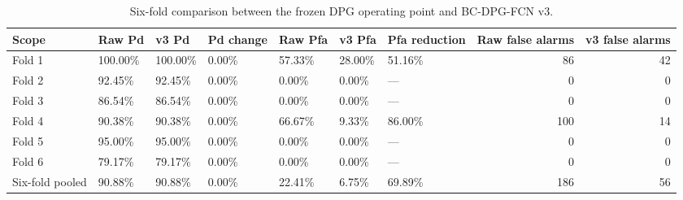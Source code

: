 \begin{table}
\caption{Six-fold comparison between the frozen DPG operating point and BC-DPG-FCN v3.}
\label{tab:bcdpg_v3_main_results}
\begin{tabular}{lllllllrr}
\toprule
Scope & Raw Pd & v3 Pd & Pd change & Raw Pfa & v3 Pfa & Pfa reduction & Raw false alarms & v3 false alarms \\
\midrule
Fold 1 & 100.00\% & 100.00\% & 0.00\% & 57.33\% & 28.00\% & 51.16\% & 86 & 42 \\
Fold 2 & 92.45\% & 92.45\% & 0.00\% & 0.00\% & 0.00\% & — & 0 & 0 \\
Fold 3 & 86.54\% & 86.54\% & 0.00\% & 0.00\% & 0.00\% & — & 0 & 0 \\
Fold 4 & 90.38\% & 90.38\% & 0.00\% & 66.67\% & 9.33\% & 86.00\% & 100 & 14 \\
Fold 5 & 95.00\% & 95.00\% & 0.00\% & 0.00\% & 0.00\% & — & 0 & 0 \\
Fold 6 & 79.17\% & 79.17\% & 0.00\% & 0.00\% & 0.00\% & — & 0 & 0 \\
Six-fold pooled & 90.88\% & 90.88\% & 0.00\% & 22.41\% & 6.75\% & 69.89\% & 186 & 56 \\
\bottomrule
\end{tabular}
\end{table}
